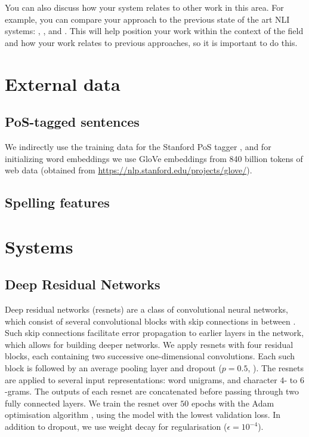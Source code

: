 \documentclass[11pt,letterpaper]{article}
\begin{document}
You can also discuss how your system relates to other work in this area. For example, you can compare your approach to the previous state of the art NLI systems: \cite{malmasi:2017:nlisg}, \cite{ionescu:2014}, \cite{bykh:2014} and \cite{jarvis-bestgen-pepper:2013:BEA8}.
This will help position your work within the context of the field and how your work relates to previous approaches, so it is important to do this.

\section{External data}
\subsection{PoS-tagged sentences}
We indirectly use the training data for the Stanford PoS tagger
\citep{Manning2014corenlp}, and for initializing word embeddings we use
GloVe embeddings from 840 billion tokens of web data (obtained from 
\url{https://nlp.stanford.edu/projects/glove/}).

\subsection{Spelling features}

\section{Systems}
\subsection{Deep Residual Networks}

Deep residual networks (resnets) are a class of convolutional neural networks, which consist of several convolutional blocks with skip connections in between \citep{He2016identity}.
Such skip connections facilitate error propagation to earlier layers in the network, which allows for building deeper networks.
We apply resnets with four residual blocks, each containing two successive one-dimensional convolutions.
Each such block is followed by an average pooling layer and dropout ($p=0.5$, \citet{dropout}).
The resnets are applied to several input representations: word unigrams, and character $4$- to $6$-grams.
The outputs of each resnet are concatenated before passing through two fully connected layers.
We train the resnet over $50$ epochs with the Adam optimisation algorithm \citep{adam}, using the model with the lowest validation loss.
In addition to dropout, we use weight decay for regularisation ($\epsilon=10^{-4}$).
\end{document}
